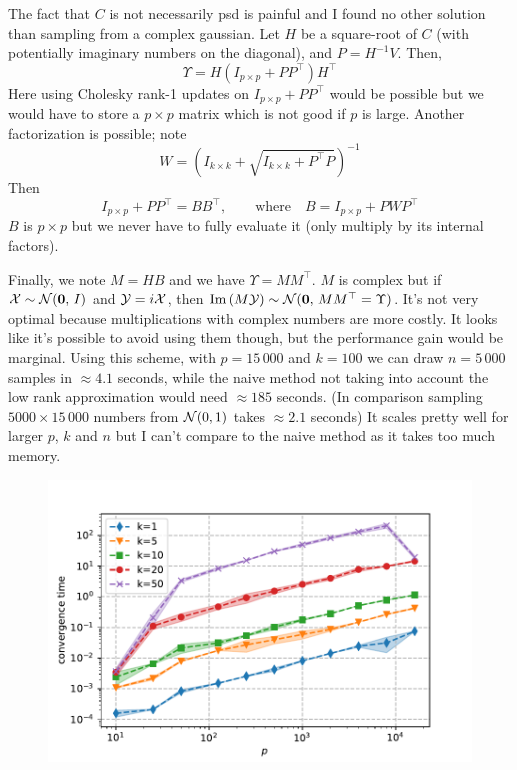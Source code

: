 The fact that $C$ is not necessarily psd is painful and I found no other solution
than sampling from a complex gaussian.
Let $H$ be a square-root of $C$ (with potentially imaginary numbers on the diagonal),
and $P = H^{-1}V$.
Then,
\begin{equation*}
    \Upsilon = H(I_{p \times p} + PP^\top)H^\top
\end{equation*}
Here using Cholesky rank-1 updates on $I_{p \times p} + PP^\top$ would be possible but
we would have to store a $p \times p$ matrix which is not good if $p$ is large.
Another factorization is possible;
note
\begin{equation*}
    W = \left(I_{k \times k} + \sqrt{I_{k \times k} + P^\top P}\right)^{-1}
\end{equation*}
Then
\begin{equation*}
    I_{p \times p} + PP^\top = BB^\top
    ,\qquad
    \text{where}
    \quad
    B = I_{p \times p} + PWP^\top
\end{equation*}
$B$ is $p \times p$ but we never have to fully evaluate it (only multiply by its internal factors).

Finally, we note $M = HB$ and we have $\Upsilon = MM^\top$.
$M$ is complex but if $\mathcal{X} \sim \mathcal{N}(\mathbf{0},\, I)$ and $\mathcal{Y} = i\mathcal{X}$,
then $\operatorname{Im}\left( M\mathcal{Y} \right) \sim \mathcal{N}(\mathbf{0},\, MM^\top = \Upsilon)$.
It's not very optimal because multiplications with complex numbers are more costly.
It looks like it's possible to avoid using them though, but the performance gain would be marginal.
Using this scheme, with $p = 15\,000$ and $k = 100$ we can draw $n = 5\,000$ samples in $\approx 4.1$ seconds,
while the naive method not taking into account the low rank approximation would need $\approx 185$ seconds.
(In comparison sampling $5000 \times 15\,000$ numbers from $\mathcal{N}(0, 1)$ takes $\approx 2.1$ seconds)
It scales pretty well for larger $p$, $k$ and $n$ but I can't compare to the naive method as it takes too much
memory.


\begin{figure}
    \centering
    \includegraphics[width=0.8\linewidth, height=0.5\linewidth]{figures/low_rank_times.pdf}
    \caption{
    }
    \label{fig:low_rank_times}
\end{figure}